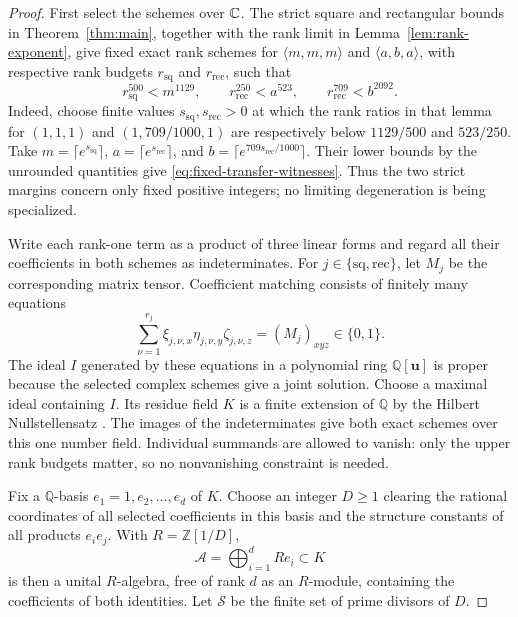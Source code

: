 \begin{proof}
First select the schemes over \(\mathbb C\).  The strict square and rectangular
bounds in Theorem~\ref{thm:main}, together with the rank limit in
Lemma~\ref{lem:rank-exponent}, give fixed exact rank schemes for
\(\langle m,m,m\rangle\) and \(\langle a,b,a\rangle\), with respective
rank budgets \(r_{\mathrm{sq}}\) and \(r_{\mathrm{rec}}\), such that
\begin{equation}\label{eq:fixed-transfer-witnesses}
 r_{\mathrm{sq}}^{500}<m^{1129},\qquad
 r_{\mathrm{rec}}^{250}<a^{523},\qquad
 r_{\mathrm{rec}}^{709}<b^{2092}.
\end{equation}
Indeed, choose finite values \(s_{\mathrm{sq}},s_{\mathrm{rec}}>0\)
at which the rank ratios in that lemma for \((1,1,1)\) and
\((1,709/1000,1)\) are respectively below \(1129/500\) and \(523/250\).
Take \(m=\lceil e^{s_{\mathrm{sq}}}\rceil\),
\(a=\lceil e^{s_{\mathrm{rec}}}\rceil\), and
\(b=\lceil e^{709s_{\mathrm{rec}}/1000}\rceil\).  Their lower bounds
by the unrounded quantities give \eqref{eq:fixed-transfer-witnesses}.
Thus the two strict margins concern only fixed positive integers;
no limiting degeneration is being specialized.

Write each rank-one term as a product of three linear forms and regard
all their coefficients in both schemes as indeterminates.  For
\(j\in\{\mathrm{sq},\mathrm{rec}\}\), let \(M_j\) be the corresponding
matrix tensor.  Coefficient matching consists of
finitely many equations
\[
 \sum_{\nu=1}^{r_j}
 \xi_{j,\nu,x}\eta_{j,\nu,y}\zeta_{j,\nu,z}
 =(M_j)_{xyz}\in\{0,1\}.
\]
The ideal \(I\) generated by these equations in a polynomial ring
\(\mathbb Q[\mathbf u]\) is proper because the selected complex
schemes give a joint solution.  Choose a maximal ideal containing
\(I\).  Its residue field \(K\) is a finite extension of \(\mathbb Q\)
by the Hilbert Nullstellensatz
\cite[Theorem~10.34.1, Tag~00FV]{stacks-nullstellensatz}.
The images of the indeterminates give both exact schemes over this
one number field.  Individual summands are allowed to vanish: only
the upper rank budgets matter, so no nonvanishing constraint is needed.

Fix a \(\mathbb Q\)-basis \(e_1=1,e_2,\ldots,e_d\) of \(K\).
Choose an integer \(D\ge1\) clearing the rational coordinates of all
selected coefficients in this basis and the structure constants of
all products \(e_i e_j\).  With \(R=\mathbb Z[1/D]\),
\[
 \mathcal A=\bigoplus_{i=1}^d R e_i\subset K
\]
is then a unital \(R\)-algebra, free of rank \(d\) as an \(R\)-module,
containing the coefficients of both identities.  Let \(\mathcal S\)
be the finite set of prime divisors of \(D\).


\end{proof}
